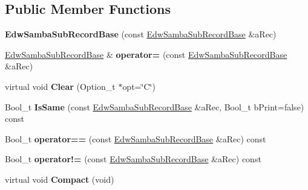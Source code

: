 \subsection*{Public Member Functions}
\begin{DoxyCompactItemize}
\item 
\hypertarget{class_edw_samba_sub_record_base_ac04faefefe6f7d73d542ea1f15080263}{
{\bfseries EdwSambaSubRecordBase} (const \hyperlink{class_edw_samba_sub_record_base}{EdwSambaSubRecordBase} \&aRec)}
\label{class_edw_samba_sub_record_base_ac04faefefe6f7d73d542ea1f15080263}

\item 
\hypertarget{class_edw_samba_sub_record_base_a372220e0e6cd26215ea5a010992ed62b}{
\hyperlink{class_edw_samba_sub_record_base}{EdwSambaSubRecordBase} \& {\bfseries operator=} (const \hyperlink{class_edw_samba_sub_record_base}{EdwSambaSubRecordBase} \&aRec)}
\label{class_edw_samba_sub_record_base_a372220e0e6cd26215ea5a010992ed62b}

\item 
\hypertarget{class_edw_samba_sub_record_base_ab3bd928d37948e6192306be83b4e1122}{
virtual void {\bfseries Clear} (Option\_\-t $\ast$opt=\char`\"{}C\char`\"{})}
\label{class_edw_samba_sub_record_base_ab3bd928d37948e6192306be83b4e1122}

\item 
\hypertarget{class_edw_samba_sub_record_base_a309dd4204cc55b505626b2a2d68e1499}{
Bool\_\-t {\bfseries IsSame} (const \hyperlink{class_edw_samba_sub_record_base}{EdwSambaSubRecordBase} \&aRec, Bool\_\-t bPrint=false) const }
\label{class_edw_samba_sub_record_base_a309dd4204cc55b505626b2a2d68e1499}

\item 
\hypertarget{class_edw_samba_sub_record_base_a98742a24f5cd3cbff5dc7ad887dd8b87}{
Bool\_\-t {\bfseries operator==} (const \hyperlink{class_edw_samba_sub_record_base}{EdwSambaSubRecordBase} \&aRec) const }
\label{class_edw_samba_sub_record_base_a98742a24f5cd3cbff5dc7ad887dd8b87}

\item 
\hypertarget{class_edw_samba_sub_record_base_ad03fadda2a28a15f457a843cfbabcfdb}{
Bool\_\-t {\bfseries operator!=} (const \hyperlink{class_edw_samba_sub_record_base}{EdwSambaSubRecordBase} \&aRec) const }
\label{class_edw_samba_sub_record_base_ad03fadda2a28a15f457a843cfbabcfdb}

\item 
\hypertarget{class_edw_samba_sub_record_base_a38c9c992b6f6b595b51ca3ba99b5dc57}{
virtual void {\bfseries Compact} (void)}
\label{class_edw_samba_sub_record_base_a38c9c992b6f6b595b51ca3ba99b5dc57}


\end{DoxyCompactItemize}

